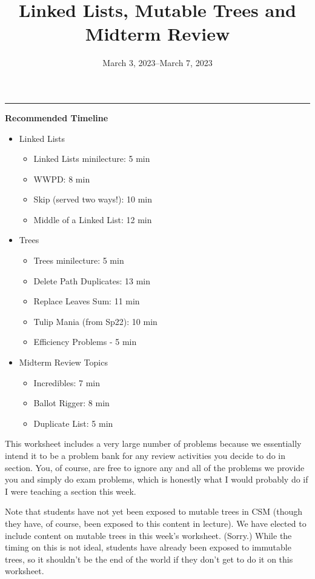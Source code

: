 \documentclass{exam}
\title{Linked Lists, Mutable Trees and Midterm Review}
\date{March 3, 2023--March 7, 2023}
\begin{document}
\maketitle
\rule{\textwidth}{0.15em}

\begin{meta}
    \textbf{Recommended Timeline}
    \begin{itemize}
        \item Linked Lists
        \begin{itemize}
            \item Linked Lists minilecture: 5 min
            \item WWPD: 8 min
            \item Skip (served two ways!): 10 min
            \item Middle of a Linked List: 12 min
        \end{itemize}
        \item Trees
        \begin{itemize}
            \item Trees minilecture: 5 min
            \item Delete Path Duplicates: 13 min
            \item Replace Leaves Sum: 11 min
            \item Tulip Mania (from Sp22): 10 min
            \item Efficiency Problems - 5 min
        \end{itemize}
        \item Midterm Review Topics
        \begin{itemize}
            \item Incredibles: 7 min
            \item Ballot Rigger: 8 min
            \item Duplicate List: 5 min
        \end{itemize}
    \end{itemize}
    This worksheet includes a very large number of problems because we essentially intend it to be a problem bank for any review activities you decide to do in section. You, of course, are free to ignore any and all of the problems we provide you and simply do exam problems, which is honestly what I would probably do if I were teaching a section this week. 

    Note that students have not yet been exposed to mutable trees in CSM (though they have, of course, been exposed to this content in lecture). We have elected to include content on mutable trees in this week's worksheet. (Sorry.) While the timing on this is not ideal, students have already been exposed to immutable trees, so it shouldn't be the end of the world if they don't get to do it on this worksheet. 
\end{meta}
\end{document}
